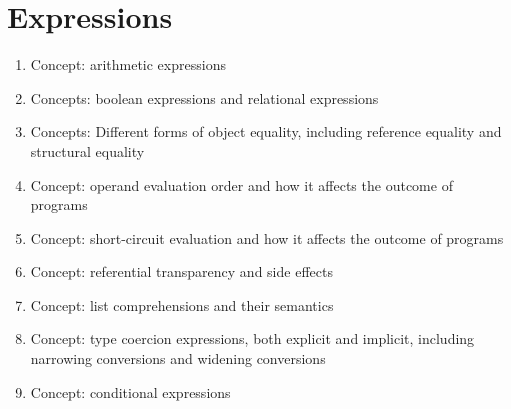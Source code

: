 \section{Expressions}\label{sec:Expressions}

\begin{enumerate}[noitemsep]
\item Concept: arithmetic expressions
\item Concepts: boolean expressions and relational expressions
\item Concepts: Different forms of object equality, including reference equality and structural equality
\item Concept: operand evaluation order and how it affects the outcome of programs
\item Concept: short-circuit evaluation and how it affects the outcome of programs
\item Concept: referential transparency and side effects
\item Concept: list comprehensions and their semantics
\item Concept: type coercion expressions, both explicit and implicit, including narrowing conversions and widening conversions
\item Concept: conditional expressions
\end{enumerate}

